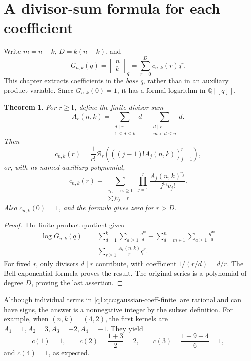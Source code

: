 \documentclass[11pt,a4paper,oneside,openany]{book}
\newtheorem{theorem}{Theorem}[chapter]
\theoremstyle{definition}
\theoremstyle{remark}
\newcommand{\Q}{\mathbb Q}
\newcommand{\GB}[3][q]{\begin{bmatrix}#2\\#3\end{bmatrix}_{#1}}
\newcommand{\Y}[1]{\mathcal B_{#1}}
\begin{document}
\section{A divisor-sum formula for each coefficient}
Write \(m=n-k\), \(D=k(n-k)\), and
\[
 G_{n,k}(q)=\GB nk=\sum_{r=0}^D c_{n,k}(r)q^r.
\]
This chapter extracts coefficients in the \emph{base} \(q\), rather than in an
auxiliary product variable. Since \(G_{n,k}(0)=1\), it has a formal logarithm
in \(\Q[[q]]\).

\begin{theorem}\label{q1:qcc:divisor-coefficients}
For \(r\ge1\), define the finite divisor sum
\begin{equation}\label{q1:qcc:arithmetic-kernel}
 A_r(n,k)=\sum_{\substack{d\mid r\\1\le d\le k}}d
          -\sum_{\substack{d\mid r\\m<d\le n}}d.
\end{equation}
Then
\begin{equation}\label{q1:qcc:gaussian-coeff-bell}
 c_{n,k}(r)=\frac1{r!}\Y r\left(
        \left((j-1)!A_j(n,k)\right)_{j=1}^r\right),
\end{equation}
or, with no named auxiliary polynomial,
\begin{equation}\label{q1:qcc:gaussian-coeff-finite}
 c_{n,k}(r)=\sum_{\substack{v_1,\ldots,v_r\ge0\\\sum jv_j=r}}
                 \prod_{j=1}^r\frac{A_j(n,k)^{v_j}}{j^{v_j}v_j!}.
\end{equation}
Also \(c_{n,k}(0)=1\), and the formula gives zero for \(r>D\).
\end{theorem}
\begin{proof}
The finite product quotient gives
\begin{align*}
 \log G_{n,k}(q)
 &=\sum_{d=1}^k\sum_{a\ge1}\frac{q^{da}}a
   -\sum_{d=m+1}^n\sum_{a\ge1}\frac{q^{da}}a\\
 &=\sum_{r\ge1}\frac{A_r(n,k)}r q^r.
\end{align*}
For fixed \(r\), only divisors \(d\mid r\) contribute, with coefficient
\(1/(r/d)=d/r\). The Bell exponential formula proves the result. The original
series is a polynomial of degree \(D\), proving the last assertion.
\end{proof}
Although individual terms in \eqref{q1:qcc:gaussian-coeff-finite} are rational and
can have signs, the answer is a nonnegative integer by the subset definition.
For example, when \((n,k)=(4,2)\), the first kernels are
\(A_1=1,A_2=3,A_3=-2,A_4=-1\). They yield
\[
 c(1)=1,\qquad c(2)=\frac{1+3}{2}=2,\qquad
 c(3)=\frac{1+9-4}{6}=1,
\]
and \(c(4)=1\), as expected.
\end{document}
